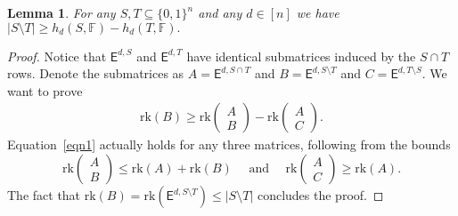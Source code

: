 \documentclass[11pt]{article}
\newtheorem{lemma}[theorem]{Lemma}
\theoremstyle{definition}
\newcommand{\rk}{\mathrm{rk}}
\newcommand{\1}{\mathbf{1}}
\newcommand{\F}{{\mathbb F}}
\renewcommand{\leq}{\leqslant}
\renewcommand{\geq}{\geqslant}
\newcommand{\eds}{ \mathsf{E}^{d,S}}
\newcommand{\edt}{\mathsf{E}^{d,T}}
\begin{document}
\begin{appendix}
\begin{lemma}\label{symmetric-difference}For any $S, T \subseteq \{0,1\}^n$ and any $d \in [n]$ we have
$ |S \setminus T| \geq h_d(S,\F) - h_d(T,\F).$
\end{lemma}
\begin{proof}  Notice that $\eds$ and $\edt$ have identical submatrices induced by the $S \cap T$ rows.  Denote the submatrices as $A = \mathsf{E}^{d,S\cap T}$ and $B = \mathsf{E}^{d,S\setminus T}$ and $C = \mathsf{E}^{d,T\setminus S}$.  We want to prove 
\begin{eqnarray}  \rk(B) \geq \rk \left( \begin{array}{c} A  \\ B  \end{array} \right ) -   \rk \left( \begin{array}{c} A \\ C  \end{array} \right ). \label{eqn1}
\end{eqnarray}
 Equation~\ref{eqn1} actually holds for any three matrices, following from the bounds 
\[\rk \left( \begin{array}{c} A  \\ B  \end{array} \right ) \leq \rk(A) +\rk(B) \ \ \ \ \ \ \mathrm{ and } \ \ \ \ \ \ \rk \left( \begin{array}{c} A  \\ C  \end{array} \right ) \geq \rk(A).  \] %
The fact that $\rk(B) = \rk(\mathsf{E}^{d,S\setminus T}) \leq |S \setminus T|$ concludes the proof.
\end{proof}


\end{appendix}
\end{document}
